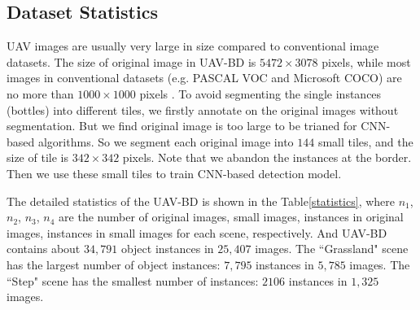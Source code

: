 



\subsection{Dataset Statistics}
\label{ssec:Dataset_Statistics}
UAV images are usually very large in size compared to conventional image datasets. The size of original image in UAV-BD is $ 5472\times 3078 $ pixels, while most images in conventional datasets (e.g. PASCAL VOC and Microsoft COCO) are no more than $ 1000\times 1000 $ pixels \cite{RCNNforSmall}. To avoid segmenting the single instances (bottles) into different tiles, we firstly annotate on the original images without segmentation. But we find original image is too large to be trianed for CNN-based algorithms. So we segment each original image into $ 144 $ small tiles, and the size of tile is $ 342\times 342 $ pixels. Note that we abandon the instances at the border. Then we use these small tiles to train CNN-based detection model. 


The detailed statistics of the UAV-BD is shown in the Table\ref{statistics}, where $ n_1 $, $ n_2 $, $ n_3 $,  $ n_4 $ are the number of original images, small images, instances in original images, instances in small images for each scene, respectively. And UAV-BD contains about $ 34,791 $ object instances in $ 25,407 $ images. The ``Grassland" scene has the largest number of object instances: $ 7,795 $ instances in $ 5,785 $ images. The ``Step" scene has the smallest number of instances: $ 2106 $ instances in $ 1,325 $ images.



